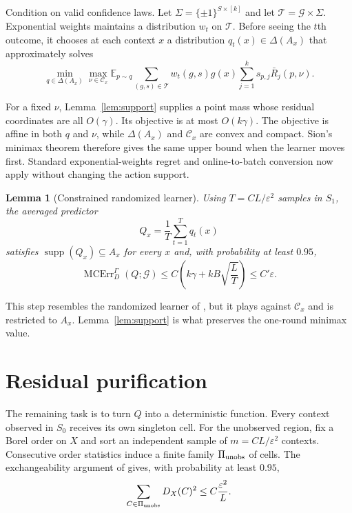 \documentclass{article}
\newtheorem{lemma}[theorem]{Lemma}
\theoremstyle{definition}
\theoremstyle{remark}
\newcommand{\E}{\mathbb E}
\newcommand{\1}{\mathbf 1}
\newcommand{\cG}{\mathcal G}
\newcommand{\cC}{\mathcal C}
\newcommand{\simplex}{\Delta}
\newcommand{\MCE}{\operatorname{MCErr}}
\newcommand{\supp}{\operatorname{supp}}
\begin{document}
Condition on valid confidence laws. Let $\Sigma=\{\pm1\}^{S\times[k]}$ and let $\mathcal T=\cG\times\Sigma$. Exponential weights maintains a distribution $w_t$ on $\mathcal T$. Before seeing the $t$th outcome, it chooses at each context $x$ a distribution $q_t(x)\in\simplex(A_x)$ that approximately solves
\begin{equation}
\min_{q\in\simplex(A_x)}\max_{\nu\in\cC_x}
\E_{p\sim q}\sum_{(g,s)\in\mathcal T}w_t(g,s)g(x)\sum_{j=1}^k s_{p,j}\bar R_j(p,\nu).
\label{eq:minimax}
\end{equation}

For a fixed $\nu$, Lemma~\ref{lem:support} supplies a point mass whose residual coordinates are all $O(\gamma)$. Its objective is at most $O(k\gamma)$. The objective is affine in both $q$ and $\nu$, while $\simplex(A_x)$ and $\cC_x$ are convex and compact. Sion's minimax theorem \citep{sion1958minimax} therefore gives the same upper bound when the learner moves first. Standard exponential-weights regret and online-to-batch conversion now apply without changing the action support.

\begin{lemma}[Constrained randomized learner]\label{lem:randomized}
Using $T=CL/\varepsilon^2$ samples in $S_1$, the averaged predictor \[ Q_x=\frac1T\sum_{t=1}^Tq_t(x) \] satisfies $\supp(Q_x)\subseteq A_x$ for every $x$ and, with probability at least $0.95$,
\begin{equation}
\MCE_D^\Gamma(Q;\cG)\le C\left(k\gamma+kB\sqrt{\frac{L}{T}}\right)\le C'\varepsilon.
\label{eq:randomizedbound}
\end{equation}
\end{lemma}

This step resembles the randomized learner of \citet{lu2026multilevel}, but it plays against $\cC_x$ and is restricted to $A_x$. Lemma~\ref{lem:support} is what preserves the one-round minimax value.

\section{Residual purification}

The remaining task is to turn $Q$ into a deterministic function. Every context observed in $S_0$ receives its own singleton cell. For the unobserved region, fix a Borel order on $X$ and sort an independent sample of $m=CL/\varepsilon^2$ contexts. Consecutive order statistics induce a finite family $\Pi_{\rm unobs}$ of cells. The exchangeability argument of \citet{noarovroth2026deterministic} gives, with probability at least $0.95$,
\begin{equation}
\sum_{C\in\Pi_{\rm unobs}}D_X(C)^2\le C\frac{\varepsilon^2}{L}.
\label{eq:cellbudget}
\end{equation}
\end{document}
